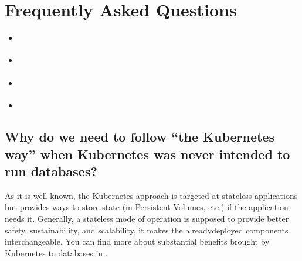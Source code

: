 \documentclass[letterpaper,10pt,english]{sphinxmanual}
\begin{document}
\chapter{Frequently Asked Questions}
\label{\detokenize{faq:frequently-asked-questions}}\label{\detokenize{faq:faq}}\label{\detokenize{faq::doc}}
\begin{sphinxShadowBox}
\begin{itemize}
\item {} 
\label{\detokenize{faq:id4}}{\hyperref[\detokenize{faq:why-do-we-need-to-follow-the-kubernetes-way-when-kubernetes-was-never-intended-to-run-databases}]{}}

\item {} 
\label{\detokenize{faq:id5}}{\hyperref[\detokenize{faq:how-can-i-contact-the-developers}]{}}

\item {} 
\label{\detokenize{faq:id6}}{\hyperref[\detokenize{faq:what-is-the-difference-between-the-operator-quickstart-and-advanced-installation-ways}]{}}

\item {} 
\label{\detokenize{faq:id7}}{\hyperref[\detokenize{faq:which-versions-of-mongodb-the-operator-supports}]{}}

\end{itemize}
\end{sphinxShadowBox}


\section{Why do we need to follow “the Kubernetes way” when Kubernetes was never intended to run databases?}
\label{\detokenize{faq:why-do-we-need-to-follow-the-kubernetes-way-when-kubernetes-was-never-intended-to-run-databases}}
As it is well known, the Kubernetes approach is targeted at stateless
applications but provides ways to store state (in Persistent Volumes, etc.) if
the application needs it. Generally, a stateless mode of operation is supposed
to provide better safety, sustainability, and scalability, it makes the
already\sphinxhyphen{}deployed components interchangeable. You can find more about substantial
benefits brought by Kubernetes to databases in .
\end{document}
